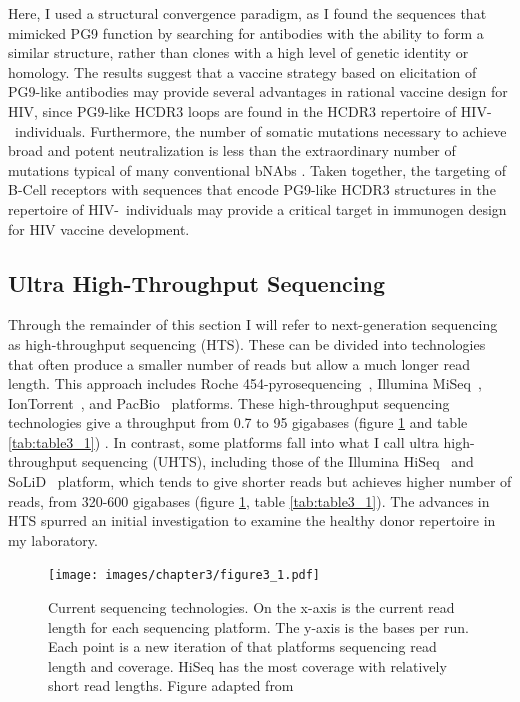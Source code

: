 Here, I used a structural convergence paradigm, as I found the sequences that mimicked PG9 function by searching for antibodies with the ability to form a similar structure, rather than clones with a high level of genetic identity or homology. The results suggest that a vaccine strategy based on elicitation of PG9-like antibodies may provide several advantages in rational vaccine design for HIV, since PG9-like HCDR3 loops are found in the HCDR3 repertoire of HIV-\naive~individuals. Furthermore, the number of somatic mutations necessary to achieve broad and potent neutralization is less than the extraordinary number of mutations typical of many conventional bNAbs \citep{Klein:2013iz}. Taken together, the targeting of B-Cell receptors with sequences that encode PG9-like HCDR3 structures in the repertoire of HIV-\naive~individuals may provide a critical target in immunogen design for HIV vaccine development.

\subsection{Ultra High-Throughput Sequencing}
Through the remainder of this section I will refer to next-generation sequencing as high-throughput sequencing (HTS). These can be divided into technologies that often produce a smaller number of reads but allow a much longer read length. This approach includes Roche 454-pyrosequencing~\textcopyright{}, Illumina MiSeq~\textcopyright{},  IonTorrent~\textcopyright{}, and PacBio~\textcopyright{} platforms. These high-throughput sequencing technologies give a throughput from 0.7 to 95 gigabases (figure \ref{fig:figure3_1} and table \ref{tab:table3_1})  \citep{developmentinNGS:2012bs}. In contrast, some platforms fall into what I call ultra high-throughput sequencing (UHTS), including those of the Illumina HiSeq~\textcopyright{} and SoLiD~\textcopyright{} platform, which tends to give shorter reads but achieves higher number of reads, from 320-600 gigabases (figure \ref{fig:figure3_1}, table \ref{tab:table3_1}). The advances in HTS spurred an initial investigation to examine the healthy donor repertoire in my laboratory.

\begin{figure}
   \centering
   \texttt{[image: images/chapter3/figure3\_1.pdf]} %
   \caption[Current Sequencing Technologies]{Current sequencing technologies. On the x-axis is the current read length for each sequencing platform. The y-axis is the bases per run. Each point is a new iteration of that platforms sequencing read length and coverage. HiSeq has the most coverage with relatively short read lengths. Figure adapted from \citep{developmentinNGS:2012bs} }
   \label{fig:figure3_1}
\end{figure}


